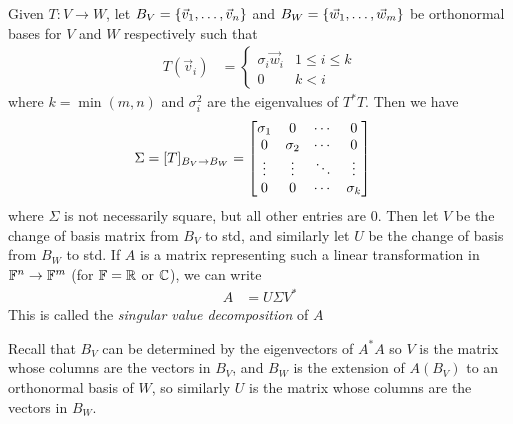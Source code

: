\begin{definition}
  Given $T : V \to W$, let $B_V = \left\{\vec v_1,\ldots,\vec v_n\right\}$ and $B_W = \left\{\vec w_1,\ldots,\vec w_m\right\}$
  be orthonormal bases for $V$ and $W$ respectively such that
    \begin{align}
      T(\vec v_i) &= \begin{cases}
        \sigma_i\vec w_i & 1 \le i \le k \\
        0 & k < i
      \end{cases}
    \end{align}
  where $k = \min(m,n)$ and $\sigma_i^2$ are the eigenvalues of $T^*T$. Then we have
    \begin{align}
      \Sigma = [T]_{B_V \to B_W} &= \begin{bmatrix}
        \sigma_1 & 0 & \cdots & 0 \\
        0 & \sigma_2 & \cdots & 0 \\
        \vdots & \vdots & \ddots & \vdots \\
        0 & 0 & \cdots & \sigma_k \end{bmatrix}
    \end{align}
  where $\Sigma$ is not necessarily square, but all other entries are 0. Then let $V$ be the change of basis matrix from $B_V$ to std, and similarly let $U$ be the change of basis from $B_W$ to std.
  If $A$ is a matrix representing such a linear transformation in $\mathbb{F}^n \to \mathbb{F}^m$ (for $\mathbb{F} = \mathbb{R}$ or $\mathbb{C}$), we can write
    \begin{align}
      A &= U \Sigma V^*
    \end{align}
  This is called the \emph{singular value decomposition} of $A$
\end{definition}
\begin{remark}
  Recall that $B_V$ can be determined by the eigenvectors of $A^*A$ so $V$ is the matrix whose columns are the vectors in $B_V$,
  and $B_W$ is the extension of $A(B_V)$ to an orthonormal basis of $W$, so similarly $U$ is the matrix whose columns are the vectors in $B_W$.
\end{remark}

